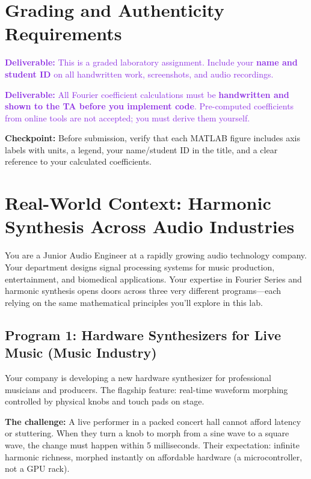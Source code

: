 \documentclass[11pt,letterpaper]{article}
\providecommand{\cpECE}[1]{\textcolor{OliveGreen}{\textbf{Checkpoint:} #1}}
\providecommand{\delECE}[1]{\textcolor{BlueViolet}{\textbf{Deliverable:} #1}}
\begin{document}
\clearpage

\section*{Grading and Authenticity Requirements}
\delECE{This is a graded laboratory assignment. Include your \textbf{name and student ID} on all handwritten work, screenshots, and audio recordings.}

\delECE{All Fourier coefficient calculations must be \textbf{handwritten and shown to the TA before you implement code}. Pre-computed coefficients from online tools are not accepted; you must derive them yourself.}

\cpECE{Before submission, verify that each MATLAB figure includes axis labels with units, a legend, your name/student ID in the title, and a clear reference to your calculated coefficients.}

\clearpage

\section{Real-World Context: Harmonic Synthesis Across Audio Industries}

\noindent
You are a Junior Audio Engineer at a rapidly growing audio technology company. Your department designs signal processing systems for music production, entertainment, and biomedical applications. Your expertise in Fourier Series and harmonic synthesis opens doors across three very different programs—each relying on the same mathematical principles you'll explore in this lab.

\subsection{Program 1: Hardware Synthesizers for Live Music (Music Industry)}

Your company is developing a new hardware synthesizer for professional musicians and producers. The flagship feature: real-time waveform morphing controlled by physical knobs and touch pads on stage.

\textbf{The challenge:} A live performer in a packed concert hall cannot afford latency or stuttering. When they turn a knob to morph from a sine wave to a square wave, the change must happen within 5 milliseconds. Their expectation: infinite harmonic richness, morphed instantly on affordable hardware (a microcontroller, not a GPU rack).
\end{document}
